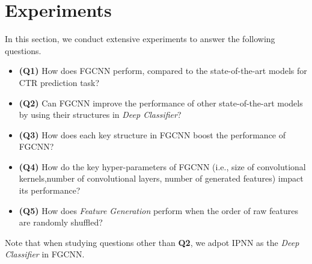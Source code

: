 \section{Experiments}

In this section, we conduct extensive experiments to answer the following questions.
\begin{itemize}
       \item \textbf{(Q1)} How does FGCNN perform, compared to the state-of-the-art models for CTR prediction task?
       \item \textbf{(Q2)} Can FGCNN improve the performance of other state-of-the-art models by using their structures in  \emph{Deep Classifier}?
       \item \textbf{(Q3)} How does each key structure in FGCNN boost the performance of FGCNN?
       \item \textbf{(Q4)} How do the key hyper-parameters of FGCNN
(i.e., size of convolutional kernels,number of convolutional layers, number
of generated features) impact its performance?
       \item \textbf{(Q5)} How does  \emph{Feature Generation}  perform when the order of raw features are randomly shuffled?
\end{itemize}

Note that when studying questions other than \textbf{Q2}, we adpot IPNN as the \emph{Deep Classifier} in FGCNN.

